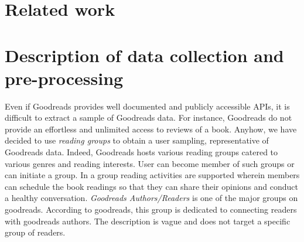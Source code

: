 \documentclass[11pt]{article}
\begin{document}
\section{Related work}

\section{Description of data collection and pre-processing}
\label{sec:data_acquisition}


Even if Goodreads provides well documented and publicly accessible APIs, it is difficult to extract a sample of Goodreads data. For instance, Goodreads do not provide an effortless and unlimited access to reviews of a book.
Anyhow, we have decided to use \emph{reading groups} to obtain a user sampling, representative of Goodreads data.
Indeed, Goodreads hosts various reading groups catered to various genres and reading interests. User can become member of such groups or can initiate a group. In a group reading activities are supported wherein members can schedule the book readings so that they can share their opinions and conduct a healthy conversation. {\it Goodreads Authors/Readers} is one of the major groups on goodreads.  According to goodreads, this group is dedicated to connecting readers with goodreads authors. The description is vague and does not target a specific group of readers.
\end{document}
